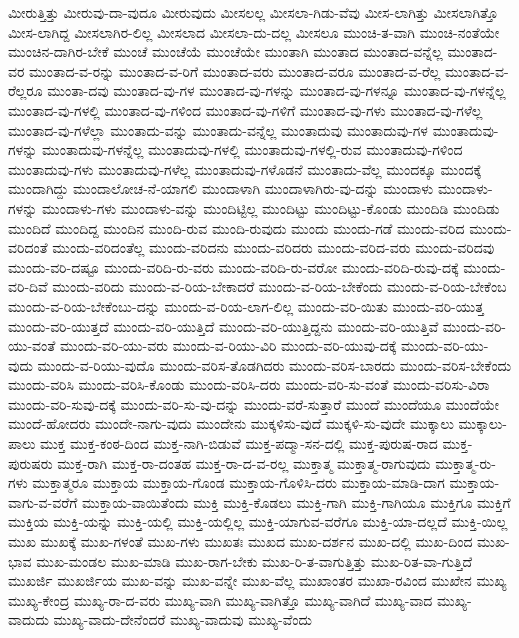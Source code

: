{ಮೀರುತ್ತಿತ್ತು
ಮೀರುವು-ದಾ-ವುದೂ
ಮೀರುವುದು
ಮೀಸಲಲ್ಲ
ಮೀಸಲಾ-ಗಿಡು-ವೆವು
ಮೀಸ-ಲಾಗಿತ್ತು
ಮೀಸಲಾಗಿತ್ತೊ
ಮೀಸ-ಲಾಗಿದ್ದ
ಮೀಸಲಾಗಿರ-ಲಿಲ್ಲ
ಮೀಸಲಾದ
ಮೀಸಲಾ-ದು-ದಲ್ಲ
ಮೀಸಲೂ
ಮುಂಚಿ-ತ-ವಾಗಿ
ಮುಂಚಿ-ನಂತೆಯೇ
ಮುಂಚಿನ-ದಾಗಿರ-ಬೇಕೆ
ಮುಂಚೆ
ಮುಂಚೆಯೆ
ಮುಂಚೆಯೇ
ಮುಂತಾಗಿ
ಮುಂತಾದ
ಮುಂತಾದ-ವನ್ನೆಲ್ಲ
ಮುಂತಾದ-ವರ
ಮುಂತಾದ-ವ-ರನ್ನು
ಮುಂತಾದ-ವ-ರಿಗೆ
ಮುಂತಾದ-ವರು
ಮುಂತಾದ-ವರೂ
ಮುಂತಾದ-ವ-ರೆಲ್ಲ
ಮುಂತಾದ-ವ-ರೆಲ್ಲರೂ
ಮುಂತಾ-ದವು
ಮುಂತಾದ-ವು-ಗಳ
ಮುಂತಾದ-ವು-ಗಳನ್ನು
ಮುಂತಾದ-ವು-ಗಳನ್ನೂ
ಮುಂತಾದ-ವು-ಗಳನ್ನೆಲ್ಲ
ಮುಂತಾದ-ವು-ಗಳಲ್ಲಿ
ಮುಂತಾದ-ವು-ಗಳಿಂದ
ಮುಂತಾದ-ವು-ಗಳಿಗೆ
ಮುಂತಾದ-ವು-ಗಳು
ಮುಂತಾದ-ವು-ಗಳೆಲ್ಲ
ಮುಂತಾದ-ವು-ಗಳೆಲ್ಲಾ
ಮುಂತಾದು-ವನ್ನು
ಮುಂತಾದು-ವನ್ನೆಲ್ಲ
ಮುಂತಾದುವು
ಮುಂತಾದುವು-ಗಳ
ಮುಂತಾದುವು-ಗಳನ್ನು
ಮುಂತಾದುವು-ಗಳನ್ನೆಲ್ಲ
ಮುಂತಾದುವು-ಗಳಲ್ಲಿ
ಮುಂತಾದುವು-ಗಳಲ್ಲಿ-ರುವ
ಮುಂತಾದುವು-ಗಳಿಂದ
ಮುಂತಾದುವು-ಗಳು
ಮುಂತಾದುವು-ಗಳೆಲ್ಲ
ಮುಂತಾದುವು-ಗಳೊಡನೆ
ಮುಂತಾದು-ವೆಲ್ಲ
ಮುಂದಕ್ಕೂ
ಮುಂದಕ್ಕೆ
ಮುಂದಾಗಿದ್ದು
ಮುಂದಾಲೋಚ-ನೆ-ಯಾಗಲಿ
ಮುಂದಾಳಾಗಿ
ಮುಂದಾಳಾಗಿರು-ವು-ದನ್ನು
ಮುಂದಾಳು
ಮುಂದಾಳು-ಗಳನ್ನು
ಮುಂದಾಳು-ಗಳು
ಮುಂದಾಳು-ವನ್ನು
ಮುಂದಿಟ್ಟಿಲ್ಲ
ಮುಂದಿಟ್ಟು
ಮುಂದಿಟ್ಟು-ಕೊಂಡು
ಮುಂದಿಡಿ
ಮುಂದಿಡು
ಮುಂದಿದೆ
ಮುಂದಿದ್ದ
ಮುಂದಿನ
ಮುಂದಿ-ರುವ
ಮುಂದಿ-ರುವುದು
ಮುಂದು
ಮುಂದು-ಗಡೆ
ಮುಂದು-ವರಿದ
ಮುಂದು-ವರಿದಂತೆ
ಮುಂದು-ವರಿದಂತೆಲ್ಲ
ಮುಂದು-ವರಿದನು
ಮುಂದು-ವರಿದರು
ಮುಂದು-ವರಿದ-ವರು
ಮುಂದು-ವರಿದವು
ಮುಂದು-ವರಿ-ದಷ್ಟೂ
ಮುಂದು-ವರಿದಿ-ರು-ವರು
ಮುಂದು-ವರಿದಿ-ರು-ವರೋ
ಮುಂದು-ವರಿದಿ-ರುವು-ದಕ್ಕೆ
ಮುಂದು-ವರಿ-ದಿವೆ
ಮುಂದು-ವರಿದು
ಮುಂದು-ವ-ರಿಯ-ಬೇಕಾದರೆ
ಮುಂದು-ವ-ರಿಯ-ಬೇಕೆಂದು
ಮುಂದು-ವ-ರಿಯ-ಬೇಕೆಂಬ
ಮುಂದು-ವ-ರಿಯ-ಬೇಕೆಂಬು-ದನ್ನು
ಮುಂದು-ವ-ರಿಯ-ಲಾಗ-ಲಿಲ್ಲ
ಮುಂದು-ವರಿ-ಯಿತು
ಮುಂದು-ವರಿ-ಯುತ್ತ
ಮುಂದು-ವರಿ-ಯುತ್ತದೆ
ಮುಂದು-ವರಿ-ಯುತ್ತಿದೆ
ಮುಂದು-ವರಿ-ಯುತ್ತಿದ್ದನು
ಮುಂದು-ವರಿ-ಯುತ್ತಿವೆ
ಮುಂದು-ವರಿ-ಯು-ವಂತೆ
ಮುಂದು-ವರಿ-ಯು-ವರು
ಮುಂದು-ವ-ರಿಯು-ವಿರಿ
ಮುಂದು-ವರಿ-ಯುವು-ದಕ್ಕೆ
ಮುಂದು-ವರಿ-ಯು-ವುದು
ಮುಂದು-ವ-ರಿಯು-ವುದೊ
ಮುಂದು-ವರಿಸ-ತೊಡಗಿದರು
ಮುಂದು-ವರಿಸ-ಬಾರದು
ಮುಂದು-ವರಿಸ-ಬೇಕೆಂದು
ಮುಂದು-ವರಿಸಿ
ಮುಂದು-ವರಿಸಿ-ಕೊಂಡು
ಮುಂದು-ವರಿಸಿ-ದರು
ಮುಂದು-ವರಿ-ಸು-ವಂತೆ
ಮುಂದು-ವರಿಸು-ವಿರಾ
ಮುಂದು-ವರಿ-ಸುವು-ದಕ್ಕೆ
ಮುಂದು-ವರಿ-ಸು-ವು-ದನ್ನು
ಮುಂದು-ವರೆ-ಸುತ್ತಾರೆ
ಮುಂದೆ
ಮುಂದೆಯೂ
ಮುಂದೆಯೇ
ಮುಂದೆ-ಹೋದರು
ಮುಂದೇ-ನಾಗು-ವುದು
ಮುಂದೇನು
ಮುಕ್ಕಳಿಸು-ವುದೆ
ಮುಕ್ಕಳಿ-ಸು-ವುದೇ
ಮುಕ್ಕಾಲು
ಮುಕ್ಕಾಲು-ಪಾಲು
ಮುಕ್ತ
ಮುಕ್ತ-ಕಂಠ-ದಿಂದ
ಮುಕ್ತ-ನಾಗಿ-ಬಿಡುವೆ
ಮುಕ್ತ-ಪದ್ಮಾ-ಸನ-ದಲ್ಲಿ
ಮುಕ್ತ-ಪುರುಷ-ರಾದ
ಮುಕ್ತ-ಪುರುಷರು
ಮುಕ್ತ-ರಾಗಿ
ಮುಕ್ತ-ರಾ-ದಂತಹ
ಮುಕ್ತ-ರಾ-ದ-ವ-ರಲ್ಲ
ಮುಕ್ತಾತ್ಮ
ಮುಕ್ತಾತ್ಮ-ರಾಗುವುದು
ಮುಕ್ತಾತ್ಮ-ರು-ಗಳು
ಮುಕ್ತಾತ್ಮರೂ
ಮುಕ್ತಾಯ
ಮುಕ್ತಾಯ-ಗೊಂಡ
ಮುಕ್ತಾಯ-ಗೊಳಿಸಿ-ದರು
ಮುಕ್ತಾಯ-ಮಾಡಿ-ದಾಗ
ಮುಕ್ತಾಯ-ವಾಗು-ವ-ವರೆಗೆ
ಮುಕ್ತಾಯ-ವಾಯಿತೆಂದು
ಮುಕ್ತಿ
ಮುಕ್ತಿ-ಕೊಡಲು
ಮುಕ್ತಿ-ಗಾಗಿ
ಮುಕ್ತಿ-ಗಾಗಿಯೂ
ಮುಕ್ತಿಗೂ
ಮುಕ್ತಿಗೆ
ಮುಕ್ತಿಯ
ಮುಕ್ತಿ-ಯನ್ನು
ಮುಕ್ತಿ-ಯಲ್ಲಿ
ಮುಕ್ತಿ-ಯಲ್ಲಿಲ್ಲ
ಮುಕ್ತಿ-ಯಾಗುವ-ವರೆಗೂ
ಮುಕ್ತಿ-ಯಾ-ದಲ್ಲದೆ
ಮುಕ್ತಿ-ಯಿಲ್ಲ
ಮುಖ
ಮುಖಕ್ಕೆ
ಮುಖ-ಗಳಂತೆ
ಮುಖ-ಗಳು
ಮುಖತಃ
ಮುಖದ
ಮುಖ-ದರ್ಶನ
ಮುಖ-ದಲ್ಲಿ
ಮುಖ-ದಿಂದ
ಮುಖ-ಭಾವ
ಮುಖ-ಮಂಡಲ
ಮುಖ-ಮಾಡಿ
ಮುಖ-ರಾಗ-ಬೇಕು
ಮುಖ-ರಿ-ತ-ವಾಗುತ್ತಿತ್ತು
ಮುಖ-ರಿತ-ವಾ-ಗುತ್ತಿದೆ
ಮುಖರ್ಜಿ
ಮುಖರ್ಜಿಯ
ಮುಖ-ವನ್ನು
ಮುಖ-ವನ್ನೇ
ಮುಖ-ವೆಲ್ಲ
ಮುಖಾಂತರ
ಮುಖಾ-ರವಿಂದ
ಮುಖೇನ
ಮುಖ್ಯ
ಮುಖ್ಯ-ಕೇಂದ್ರ
ಮುಖ್ಯ-ರಾ-ದ-ವರು
ಮುಖ್ಯ-ವಾಗಿ
ಮುಖ್ಯ-ವಾಗಿತ್ತೊ
ಮುಖ್ಯ-ವಾಗಿದೆ
ಮುಖ್ಯ-ವಾದ
ಮುಖ್ಯ-ವಾದುದು
ಮುಖ್ಯ-ವಾದು-ದೇನೆಂದರೆ
ಮುಖ್ಯ-ವಾದುವು
ಮುಖ್ಯ-ವೆಂದು
}
